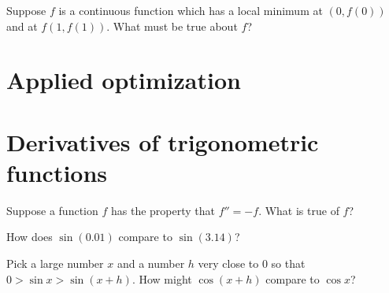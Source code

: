 \documentclass{ximera}
\begin{document}
\begin{problem}
  Suppose $f$ is a continuous function which has a local minimum at $(0,f(0))$ and at $f(1,f(1))$.  What must be true about $f$?
  \begin{multipleChoice}
  \end{multipleChoice}
\end{problem}

\clearpage

\section{Applied optimization}

\clearpage

\section{Derivatives of trigonometric functions}

\begin{problem}
  Suppose a function $f$ has the property that $f'' = -f$.  What is true of $f$?
  \begin{multipleChoice}
  \end{multipleChoice}
\end{problem}

\begin{problem}
  How does $\sin(0.01)$ compare to $\sin(3.14)$?
  \begin{multipleChoice}
  \end{multipleChoice}
\end{problem}

\begin{problem}
  Pick a large number $x$ and a number $h$ very close to $0$ so that $0 > \sin x > \sin (x+h)$.  How might $\cos (x+h)$ compare to $\cos x$?
  \begin{multipleChoice}
  \end{multipleChoice}
\end{problem}
\end{document}
